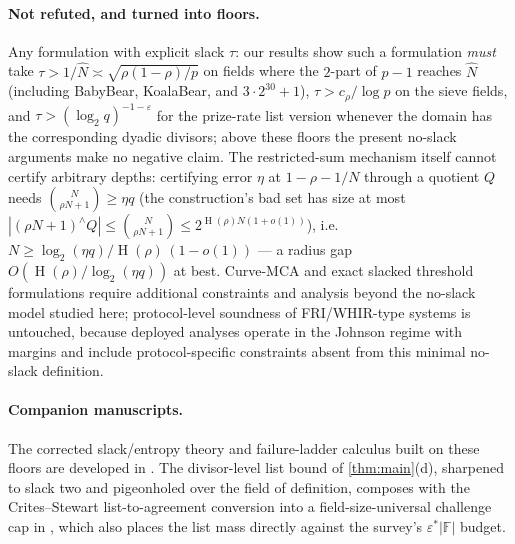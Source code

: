 \documentclass[11pt]{article}
\theoremstyle{definition}
\newcommand{\F}{\mathbb F}
\newcommand{\eps}{\varepsilon}
\newcommand{\HH}{\operatorname{H}}
\begin{document}
\paragraph{Not refuted, and turned into floors.}  Any formulation with explicit slack $\tau$: our results show such a formulation \emph{must} take $\tau>1/\hat N\asymp\sqrt{\rho(1-\rho)/p}$ on fields where the $2$-part of $p-1$ reaches $\hat N$ (including BabyBear, KoalaBear, and $3\cdot2^{30}+1$), $\tau>c_\rho/\log p$ on the sieve fields, and $\tau>(\log_2q)^{-1-\eps}$ for the prize-rate list version whenever the domain has the corresponding dyadic divisors; above these floors the present no-slack arguments make no negative claim.  The restricted-sum mechanism itself cannot certify arbitrary depths: certifying error $\eta$ at $1-\rho-1/N$ through a quotient $Q$ needs $\binom{N}{\rho N+1}\ge\eta q$ (the construction's bad set has size at most $|(\rho N{+}1)^{\wedge}Q|\le\binom{N}{\rho N+1}\le2^{\HH(\rho)N(1+o(1))}$), i.e.\ $N\ge\log_2(\eta q)/\HH(\rho)\,(1-o(1))$ --- a radius gap $O(\HH(\rho)/\log_2(\eta q))$ at best.  Curve-MCA and exact slacked threshold formulations require additional constraints and analysis beyond the no-slack model studied here; protocol-level soundness of FRI/WHIR-type systems is untouched, because deployed analyses operate in the Johnson regime with margins and include protocol-specific constraints absent from this minimal no-slack definition.

\paragraph{Companion manuscripts.}  The corrected slack/entropy theory and failure-ladder calculus built on these floors are developed in \cite{SlackTheory}.  The divisor-level list bound of \cref{thm:main}(d), sharpened to slack two and pigeonholed over the field of definition, composes with the Crites--Stewart list-to-agreement conversion \cite{CS25} into a field-size-universal challenge cap in \cite{UniversalCap}, which also places the list mass directly against the survey's $\eps^*|\F|$ budget.
\end{document}
